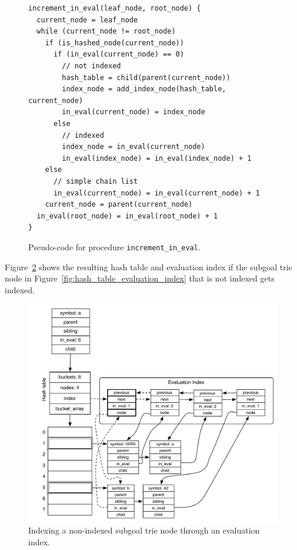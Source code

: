 \begin{figure}[ht]
\begin{Verbatim}
increment_in_eval(leaf_node, root_node) {
  current_node = leaf_node
  while (current_node != root_node)
    if (is_hashed_node(current_node))
      if (in_eval(current_node) == 0)
        // not indexed
        hash_table = child(parent(current_node))
        index_node = add_index_node(hash_table, current_node)
        in_eval(current_node) = index_node
      else
        // indexed
        index_node = in_eval(current_node)
        in_eval(index_node) = in_eval(index_node) + 1
    else
      // simple chain list
      in_eval(current_node) = in_eval(current_node) + 1
    current_node = parent(current_node)
  in_eval(root_node) = in_eval(root_node) + 1
}
\end{Verbatim}
\caption{Pseudo-code for procedure \texttt{increment\_in\_eval}.}
\label{fig:increment_in_eval}
\end{figure}

Figure~\ref{fig:hash_table_evaluation_index_increment} shows the
resulting hash table and evaluation index if the subgoal trie node in
Figure~\ref{fig:hash_table_evaluation_index} that is not indexed gets
indexed.

\begin{figure}[ht]
  \centering
  \includegraphics[scale=0.6]{hash_table_evaluation_index_increment.pdf}
  \caption{Indexing a non-indexed subgoal trie node through an evaluation index.}
  \label{fig:hash_table_evaluation_index_increment}
\end{figure}

